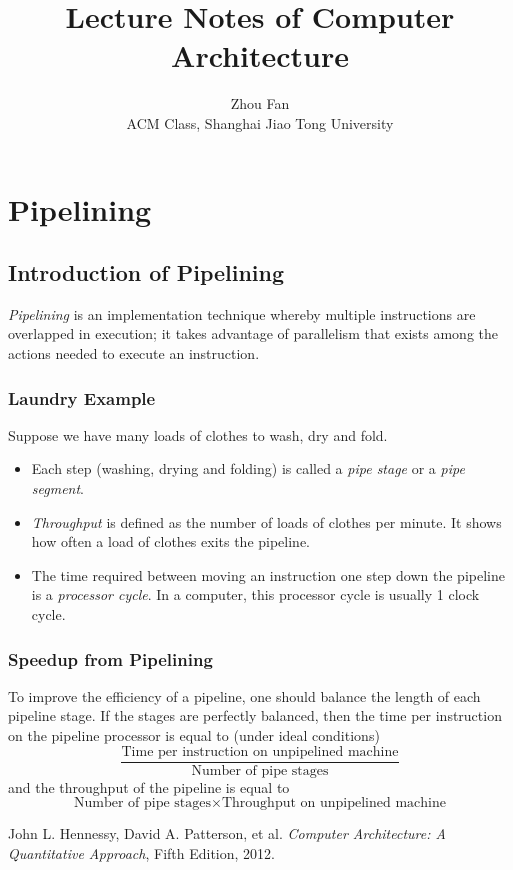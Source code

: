 \documentclass[12pt, a4paper]{article}
\title{Lecture Notes of Computer Architecture}
\author{Zhou Fan\\ACM Class, Shanghai Jiao Tong University}
\date{}
\theoremstyle{margin}
\begin{document}
\maketitle
\tableofcontents
\newpage

\section{Pipelining}
  \subsection{Introduction of Pipelining}
    \emph{Pipelining} is an implementation technique whereby multiple instructions are overlapped in execution; it takes advantage of parallelism that exists among the actions needed to execute an instruction.\cite{caqa}
    \subsubsection{Laundry Example}
      Suppose we have many loads of clothes to wash, dry and fold. 
      \begin{itemize}
        \item Each step (washing, drying and folding) is called a \emph{pipe stage} or a \emph{pipe segment}. 
        \item \emph{Throughput} is defined as the number of loads of clothes per minute. It shows how often a load of clothes exits the pipeline.
        \item The time required between moving an instruction one step down the pipeline is a \emph{processor cycle}. In a computer, this processor cycle is usually 1 clock cycle.
      \end{itemize}
    \subsubsection{Speedup from Pipelining}
      To improve the efficiency of a pipeline, one should balance the length of each pipeline stage. If the stages are perfectly balanced, then the time per instruction on the pipeline processor is equal to (under ideal conditions) 
      $$\frac{\mbox{Time per instruction on unpipelined machine}}{\mbox{Number of pipe stages}}$$
      and the throughput of the pipeline is equal to
      $$\mbox{Number of pipe stages} \times \mbox{Throughput on unpipelined machine}$$

\begin{thebibliography}{9}
    John L. Hennessy, David A. Patterson, et al.
    \emph{Computer Architecture: A Quantitative Approach},
    Fifth Edition, 2012. 
\end{thebibliography}
\end{document}
